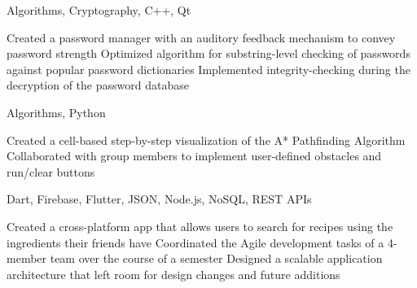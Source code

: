 \documentclass[12pt,letterpaper]{article}
\begin{document}
\begin{cprojectsection}
    {Algorithms, Cryptography, C++, Qt}{
        \begin{details}
            \detail Created a password manager with an auditory feedback mechanism to convey password strength
            \detail Optimized algorithm for substring-level checking of passwords against popular password dictionaries
            \detail Implemented integrity-checking during the decryption of the password database
        \end{details}
    }
    {Algorithms, Python}{
        \begin{details}
            \detail Created a cell-based step-by-step visualization of the A* Pathfinding Algorithm
            \detail Collaborated with group members to implement user-defined obstacles and run/clear buttons
        \end{details}
    }
    {Dart, Firebase, Flutter, JSON, Node.js, NoSQL, REST APIs}{
        \begin{details}
            \detail Created a cross-platform app that allows users to search for recipes using the ingredients their friends have
            \detail Coordinated the Agile development tasks of a 4-member team over the course of a semester
            \detail Designed a scalable application architecture that left room for design changes and future additions
        \end{details}
    }
\end{cprojectsection}
\end{document}
